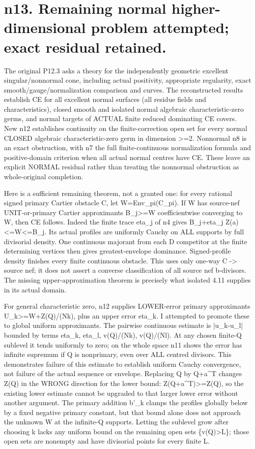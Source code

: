 \documentclass[11pt]{article}
\begin{document}
\section*{n13. Remaining normal higher-dimensional problem attempted; exact residual retained.}
The original P12.3 asks a theory for the independently geometric excellent singular/nonnormal cone, including actual positivity, appropriate regularity, exact smooth/gauge/normalization comparison and curves. The reconstructed results establish CE for all excellent normal surfaces (all residue fields and characteristics), closed smooth and isolated normal algebraic characteristic-zero germs, and normal targets of ACTUAL finite reduced dominating CE covers. New n12 establishes continuity on the finite-correction open set for every normal CLOSED algebraic characteristic-zero germ in dimension >=2. Nonnormal n8 is an exact obstruction, with n7 the full finite-continuous normalization formula and positive-domain criterion when all actual normal centres have CE. These leave an explicit NORMAL residual rather than treating the nonnormal obstruction as whole-original completion.

Here is a sufficient remaining theorem, not a granted one: for every rational signed primary Cartier obstacle C, let W=Env\_pi(C\_pi). If W has source-nef UNIT-or-primary Cartier approximants B\_j>=W coefficientwise converging to W, then CE follows. Indeed the finite trace eta\_j of n4 gives B\_j+eta\_j Z(a)<=W<=B\_j. Its actual profiles are uniformly Cauchy on ALL supports by full divisorial density. One continuous majorant from each D competitor at the finite determining vertices then gives greatest-envelope dominance. Signed-profile density finishes every finite continuous obstacle. This uses only one-way C -> source nef; it does not assert a converse classification of all source nef b-divisors. The missing upper-approximation theorem is precisely what isolated 4.11 supplies in its actual domain.

For general characteristic zero, n12 supplies LOWER-error primary approximants U\_k>=W+Z(Q)/(Nk), plus an upper error eta\_k. I attempted to promote these to global uniform approximants. The pairwise continuous estimate is |u\_k-u\_l| bounded by terms eta\_k, eta\_l, v(Q)/(Nk), v(Q)/(Nl). At any chosen finite-Q sublevel it tends uniformly to zero; on the whole space n11 shows the error has infinite supremum if Q is nonprimary, even over ALL centred divisors. This demonstrates failure of this estimate to establish uniform Cauchy convergence, not failure of the actual sequence or envelope. Replacing Q by Q+a\textasciicircum{}T changes Z(Q) in the WRONG direction for the lower bound: Z(Q+a\textasciicircum{}T)>=Z(Q), so the existing lower estimate cannot be upgraded to that larger lower error without another argument. The primary addition b'\_k clamps the profiles globally below by a fixed negative primary constant, but that bound alone does not approach the unknown W at the infinite-Q supports. Letting the sublevel grow after choosing k lacks any uniform bound on the remaining open sets \{v(Q)>L\}; those open sets are nonempty and have divisorial points for every finite L.
\end{document}
